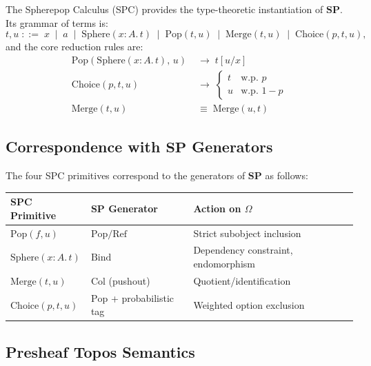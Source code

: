 \documentclass[12pt, a4paper]{article}
\theoremstyle{definition}
\theoremstyle{remark}
\newcommand{\SP}{\mathbf{SP}}
\newcommand{\Pop}{\mathrm{Pop}}
\newcommand{\Refuse}{\mathrm{Ref}}
\newcommand{\Bind}{\mathrm{Bind}}
\newcommand{\Collapse}{\mathrm{Col}}
\newcommand{\Sphere}{\mathrm{Sphere}}
\newcommand{\Choice}{\mathrm{Choice}}
\newcommand{\Merge}{\mathrm{Merge}}
\begin{document}
The Spherepop Calculus (SPC) provides the type-theoretic
instantiation of $\SP$. Its grammar of terms is:
\[
  t, u \;::=\; x \;\mid\; a \;\mid\; \Sphere(x\!:\!A.\,t) \;\mid\; \Pop(t, u) \;\mid\;
  \Merge(t, u) \;\mid\; \Choice(p, t, u),
\]
and the core reduction rules are:
\begin{align}
  \Pop(\Sphere(x\!:\!A.\,t),\, u) &\;\to\; t[u/x] \tag{$\beta$-reduction}\\
  \Choice(p, t, u) &\;\to\; \begin{cases} t & \text{w.p. } p \\ u & \text{w.p. } 1-p \end{cases}
  \tag{probabilistic sampling}\\
  \Merge(t, u) &\;\equiv\; \Merge(u, t) \tag{commutativity}
\end{align}

\subsection{Correspondence with \texorpdfstring{$\SP$}{SP} Generators}

The four SPC primitives correspond to the generators of $\SP$ as follows:

\begin{center}
\renewcommand{\arraystretch}{1.5}
\begin{tabular}{lll}
\toprule
\textbf{SPC Primitive} & \textbf{$\SP$ Generator} & \textbf{Action on $\Omega$} \\
\midrule
$\Pop(f, u)$ & $\Pop / \Refuse$ & Strict subobject inclusion \\
$\Sphere(x\!:\!A.\,t)$ & $\Bind$ & Dependency constraint, endomorphism \\
$\Merge(t, u)$ & $\Collapse$ (pushout) & Quotient/identification \\
$\Choice(p, t, u)$ & $\Pop$ + probabilistic tag & Weighted option exclusion \\
\bottomrule
\end{tabular}
\end{center}

\subsection{Presheaf Topos Semantics}
\end{document}
